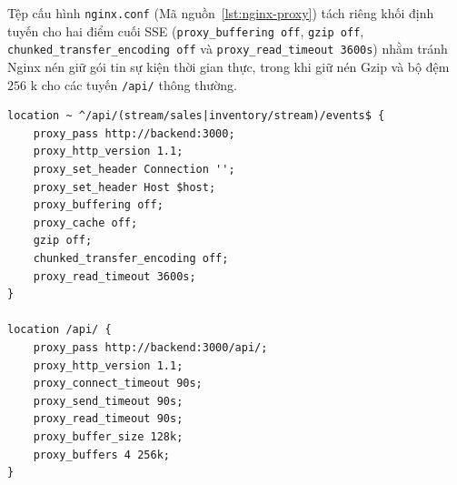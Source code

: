 Tệp cấu hình \texttt{nginx.conf} (Mã nguồn~\ref{lst:nginx-proxy}) tách riêng khối định tuyến cho hai điểm cuối SSE (\texttt{proxy_buffering off}, \texttt{gzip off}, \texttt{chunked_transfer_encoding off} và \texttt{proxy_read_timeout 3600s}) nhằm tránh Nginx nén giữ gói tin sự kiện thời gian thực, trong khi giữ nén Gzip và bộ đệm $256\text{ k}$ cho các tuyến \texttt{/api/} thông thường.

\begin{listing}[H]
	\begin{verbatim}
location ~ ^/api/(stream/sales|inventory/stream)/events$ {
    proxy_pass http://backend:3000;
    proxy_http_version 1.1;
    proxy_set_header Connection '';
    proxy_set_header Host $host;
    proxy_buffering off;
    proxy_cache off;
    gzip off;
    chunked_transfer_encoding off;
    proxy_read_timeout 3600s;
}

location /api/ {
    proxy_pass http://backend:3000/api/;
    proxy_http_version 1.1;
    proxy_connect_timeout 90s;
    proxy_send_timeout 90s;
    proxy_read_timeout 90s;
    proxy_buffer_size 128k;
    proxy_buffers 4 256k;
}
\end{verbatim}
	\caption{Cấu hình Reverse Proxy chuyên biệt cho SSE và REST API trong \texttt{nginx.conf}}
	\label{lst:nginx-proxy}
\end{listing}
